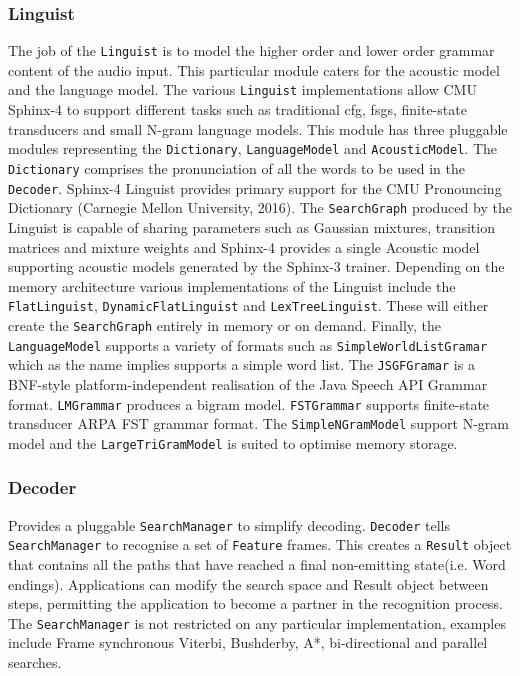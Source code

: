 \subsubsection{Linguist}
The job of the \texttt{Linguist} is to model the higher order and lower order grammar content of the audio input.  This particular module caters for the acoustic model and the language model.  The  various \texttt{Linguist} implementations allow CMU Sphinx-4 to support different tasks such as traditional \acrfull{cfg}, \acrfull{fsgs}, finite-state transducers and small N-gram language models.  This module has three pluggable modules representing the \texttt{Dictionary}, \texttt{LanguageModel} and \texttt{AcousticModel}.  The \texttt{Dictionary} comprises the pronunciation of all the words to be used in the \texttt{Decoder}. Sphinx-4 Linguist provides primary support for the CMU Pronouncing Dictionary (Carnegie Mellon University, 2016). The \texttt{SearchGraph} produced by the Linguist is capable of sharing parameters such as Gaussian mixtures, transition matrices and mixture weights and Sphinx-4 provides a single Acoustic model supporting acoustic models generated by the Sphinx-3 trainer.  Depending on the memory architecture various implementations of the Linguist include the \texttt{FlatLinguist}, \texttt{DynamicFlatLinguist} and \texttt{LexTreeLinguist}.  These will either create the \texttt{SearchGraph} entirely in memory or on demand.  Finally, the \texttt{LanguageModel} supports a variety of formats such as \texttt{SimpleWorldListGramar} which as the name implies supports a simple word list.  The \texttt{JSGFGramar} is a BNF-style platform-independent realisation of the Java Speech API Grammar format. \texttt{LMGrammar} produces a bigram model. \texttt{FSTGrammar} supports finite-state transducer ARPA FST grammar format. The \texttt{SimpleNGramModel} support N-gram model and the \texttt{LargeTriGramModel} is suited to optimise memory storage.

\subsubsection{Decoder}
Provides a pluggable \texttt{SearchManager} to simplify decoding.  \texttt{Decoder} tells \texttt{SearchManager} to recognise a set of \texttt{Feature} frames. This creates a \texttt{Result} object that contains all the paths that have reached a final non-emitting state(i.e. Word endings).  Applications can modify the search space and Result object between steps, permitting the application to become a partner in the recognition process.  The \texttt{SearchManager} is not restricted on any particular implementation, examples include Frame synchronous Viterbi, Bushderby, A*, bi-directional and parallel searches.

